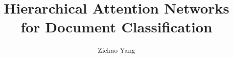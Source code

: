 \documentclass[12pt, a4paper, twocolumn]{article}
\begin{document}
\title{Hierarchical Attention Networks for Document Classification}
\author{Zichao Yang}
\date{}
\maketitle













\end{document}
